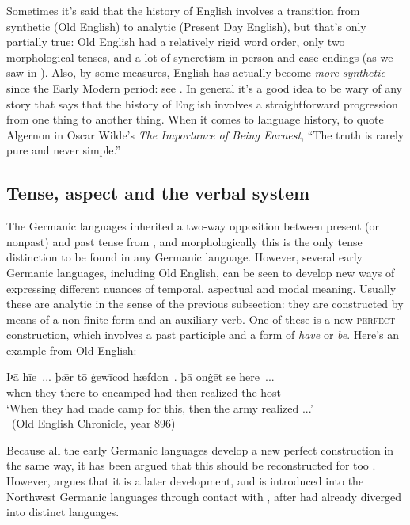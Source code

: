 Sometimes it's said that the history of English involves a transition from synthetic (Old English) to analytic (Present Day English), but that's only partially true: Old English had a relatively rigid word order, only two morphological tenses, and a lot of syncretism in person and case endings (as we saw in ). Also, by some measures, English has actually become \emph{more synthetic} since the Early Modern period: see \citet{Szmrescanyi2012}. In general it's a good idea to be wary of any story that says that the history of English involves a straightforward progression from one thing to another thing. When it comes to language history, to quote Algernon in Oscar Wilde's \emph{The Importance of Being Earnest}, ``The truth is rarely pure and never simple.''

\subsection{Tense, aspect and the verbal system}\label{prehistory-tma}
The Germanic languages inherited a two-way opposition between present (or nonpast) and past tense from , and morphologically this is the only tense distinction to be found in any Germanic language. However, several early Germanic languages, including Old English, can be seen to develop new ways of expressing different nuances of temporal, aspectual and modal meaning. Usually these are analytic in the sense of the previous subsection: they are constructed by means of a non-finite form and an auxiliary verb. One of these is a new \textsc{perfect} construction, which involves a past participle and a form of \textit{have} or \textit{be}. Here's an example from Old English:

\begin{exe}
\ex
\gll Þā hīe~... þǣr tō ġewīcod hæfdon~. þā onġēt se here~...\\
when they there to encamped had  then realized the host\\
\trans `When they had made camp for this, then the army realized ...' \\~\hfill (Old English Chronicle, year 896)
\end{exe}

\noindent Because all the early Germanic languages develop a new perfect construction in the same way, it has been argued that this should be reconstructed for  too \citep{Brinton1988}. However, \citet[Chapter 9]{Drinka2017} argues that it is a later development, and is introduced into the Northwest Germanic languages through contact with , after  had already diverged into distinct languages.

